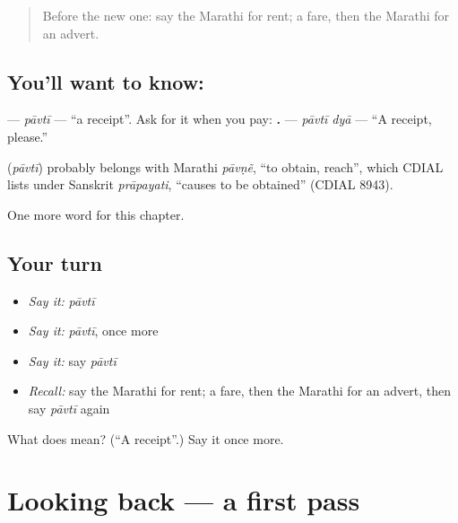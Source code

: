 \label{lesson:MR-C161-pavti}



\begin{quote}
Before the new one: say the Marathi for rent; a fare, then the Marathi for an advert.
\end{quote}

\subsection*{You'll want to know: }
\textbf{} — \emph{pāvtī} — \textquotedblleft{}a receipt\textquotedblright{}. Ask for it when you pay: \textbf{ .} — \emph{pāvtī dyā} — \textquotedblleft{}A receipt, please.\textquotedblright{}

\begin{cousinweb}
\textbf{} (\emph{pāvtī}) probably belongs with Marathi \emph{pāvṇẽ}, \textquotedblleft{}to obtain, reach\textquotedblright{}, which CDIAL lists under Sanskrit \emph{prāpayati}, \textquotedblleft{}causes to be obtained\textquotedblright{} (CDIAL 8943).
\end{cousinweb}

\begin{grammarlens}[title={What you've built}]
One more word for this chapter.
\end{grammarlens}

\subsection*{Your turn}
\begin{itemize}
\raggedright
  \item \emph{Say it:} \emph{pāvtī}
  \item \emph{Say it:} \emph{pāvtī}, once more
  \item \emph{Say it:} say \emph{pāvtī}
  \item \emph{Recall:} say the Marathi for rent; a fare, then the Marathi for an advert, then say \emph{pāvtī} again
\end{itemize}

\begin{tcolorbox}[breakable,colback=teal!4,colframe=teal!35!black,title={Before you move on}]
What does  mean? (\textquotedblleft{}A receipt\textquotedblright{}.) Say it once more.
\end{tcolorbox}
\section[(dialogue)]{Looking back — a first pass}

